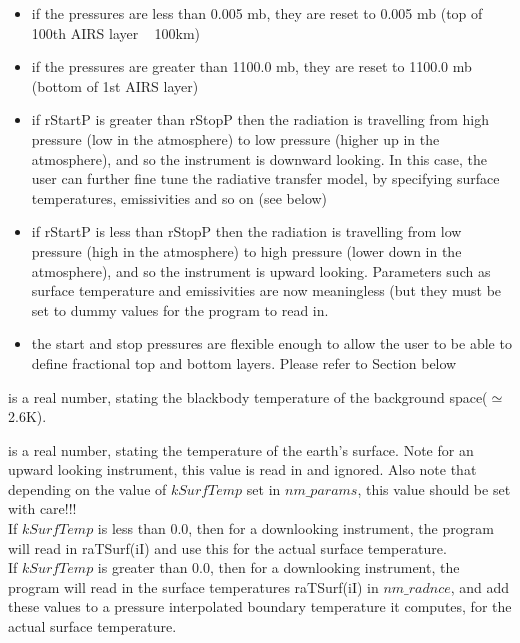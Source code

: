 \documentclass[12pt]{article}
\begin{document}
{\begin{description}
\begin{itemize}
\item if the pressures are less than 0.005 mb, they are reset to 0.005
  mb (top of 100th AIRS layer ~ 100km)
\item if the pressures are greater than 1100.0 mb, they are reset to
  1100.0 mb (bottom of 1st AIRS layer)
\item if {\sf rStartP} is greater than {\sf rStopP} then the radiation is
  travelling from high pressure (low in the atmosphere) to low
  pressure (higher up in the atmosphere), and so the instrument is
  downward looking.  In this case, the user can further fine tune the
  radiative transfer model, by specifying surface temperatures,
  emissivities and so on (see below)
\item if {\sf rStartP} is less than {\sf rStopP} then the radiation is
  travelling from low pressure (high in the atmosphere) to high
  pressure (lower down in the atmosphere), and so the instrument is
  upward looking.  Parameters such as surface temperature and
  emissivities are now meaningless (but they {\sf must} be set to
  dummy values for the program to read in.
\item the start and stop pressures are flexible enough to allow the
  user to be able to define fractional top and bottom layers.  Please
  refer to Section \cite{FractionalLayers} below
\end{itemize}

\item[{\sf raTSpace(iI)}] is a real number, stating the blackbody 
temperature of the background space($\simeq$ 2.6K). \\

\item[{\sf raTSurf(iI)}] is a real number, stating the
temperature of the earth's surface.  Note for an upward looking
instrument, this value is read in and ignored. Also note that depending on the
value of $kSurfTemp$ set in $nm\_params$, this value should be set with 
care!!!\\
If $kSurfTemp$ is less than 0.0, then for a downlooking instrument, the 
program will read in raTSurf(iI) and use this for the actual surface 
temperature.\\
If $kSurfTemp$ is greater than 0.0, then for a downlooking instrument, the 
program will read in the surface temperatures raTSurf(iI) in $nm\_radnce$, 
and add these values to a pressure interpolated boundary temperature it 
computes, for the actual surface temperature.


\end{description}}
\end{document}
